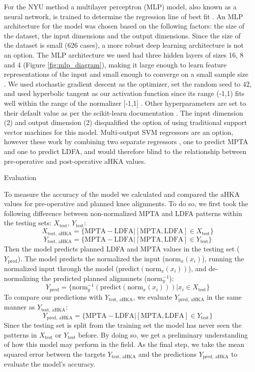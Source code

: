 \documentclass{article}
\begin{document}
	For the NYU method a multilayer perceptron (MLP) model, also known as a neural network, is trained to determine the regression line of best fit \cite{mlp-paper}.
An MLP architecture for the model was chosen based on the following factors: the size of the dataset, the input dimensions and the output dimensions.
Since the size of the dataset is small (626 cases), a more robust deep learning architecture is not an option.
The MLP architecture we used had three hidden layers of sizes 16, 8 and 4 (Figure \ref{fig:mlp_diagram}),
making it large enough to learn feature representations of the input and small enough to converge on a small sample size \cite{deep-learning-paper}.
We used stochastic gradient descent as the optimizer, set the random seed to 42, and used hyperbolic tangent as our activation function since its range (-1,1)
fits well within the range of the normalizer [-1,1] \cite{sgd-paper, mlp-paper}.
Other hyperparameters are set to their default value as per the scikit-learn documentation \cite{sklearn-sgd, adaptive-lr, scikit-learn, momentum-paper}.
The input dimension (2) and output dimension (2) disqualified the option of using traditional support vector machines for this model.
Multi-output SVM regressors are an option, however these work by combining two separate regressors \cite{svm-paper},
one to predict MPTA and one to predict LDFA, and would therefore blind to the relationship between pre-operative and post-operative aHKA values. 

Evaluation

	To measure the accuracy of the model we calculated and compared the aHKA values for pre-operative and planned knee alignments.
To do so, we first took the following difference between non-normalized MPTA and LDFA patterns within the testing sets: 
$X_\text{test}$, $Y_\text{test}$: 
$$X_\text{test, aHKA}=\{\text{MPTA} - \text{LDFA} | [\text{MPTA}, \text{LDFA}] \in X_\text{test}\}$$
$$Y_\text{test, aHKA}=\{\text{MPTA} - \text{LDFA} | [\text{MPTA}, \text{LDFA}] \in Y_\text{test}\}$$
Then the model predicts planned LDFA and MPTA values in the testing set ($Y_\text{pred}$). 
The model predicts the normalized the input ($\text{norm}_x(x_i)$), running the normalized input through the model ($\text{predict}(\text{norm}_x(x_i))$),
and de-normalizing the predicted planned alignmnets ($\text{norm}_y^{-1}$):
$$Y_\text{pred}=\{\text{norm}_y^{-1}(\text{predict}(\text{norm}_x(x_i))) | x_i \in X_\text{test}\}$$
To compare our predictions with $Y_\text{test, aHKA}$, we evaluate $Y_\text{pred, aHKA}$ in the same manner as $Y_\text{test, aHKA}$: 
$$Y_\text{pred, aHKA}=\{\text{MPTA} - \text{LDFA} | [\text{MPTA}, \text{LDFA}] \in Y_\text{test}\}$$
Since the testing set is split from the training set the model has never seen the patterns in $X_\text{test}$ or $Y_\text{test}$ before.
By doing so, we get a preliminary understanding of how this model may perform in the field.
As the final step, we take the mean squared error between the targets $Y_\text{test, aHKA}$ and the predictions $Y_\text{pred, aHKA}$ to evaluate the model's accuracy.
\end{document}
